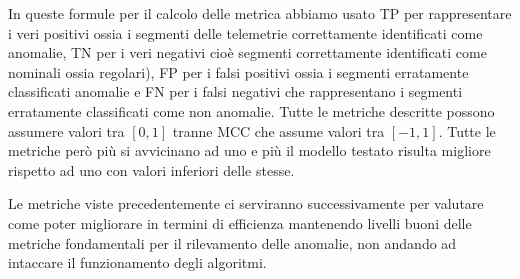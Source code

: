 In queste formule per il calcolo delle metrica abbiamo usato TP per rappresentare i veri positivi ossia i segmenti delle telemetrie correttamente identificati come anomalie, TN per i veri negativi cioè segmenti correttamente identificati come nominali ossia regolari), FP per i falsi positivi ossia i segmenti erratamente classificati anomalie e FN per i falsi negativi che rappresentano i segmenti erratamente classificati come non anomalie.
Tutte le metriche descritte possono assumere valori tra $[0,1]$ tranne MCC che assume valori tra $[-1,1]$.
Tutte le metriche però più si avvicinano ad uno e più il modello testato risulta migliore rispetto ad uno con valori inferiori delle stesse.

Le metriche viste precedentemente ci serviranno successivamente per valutare come poter migliorare in termini di efficienza mantenendo livelli buoni delle metriche fondamentali per il rilevamento delle anomalie, non andando ad intaccare il funzionamento degli algoritmi.
